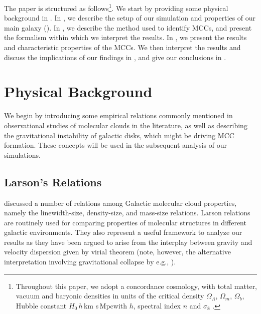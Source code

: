 \IfFileExists{emulateapjlegacy.cls}{\documentclass[iop]{emulateapjlegacy}}{\documentclass[iop]{emulateapj}}
\begin{document}
The paper is structured as follows\footnote{Throughout this paper, we adopt a concordance cosmology, with total matter, vacuum and baryonic densities in units of the critical density $\Omega_{\Lambda}$, $\Omega_m$, $\Omega_b$, Hubble constant $H_0$\,$h$\,km s\pmOne\,Mpc\pmOne with $h$, spectral index $n$ and $\sigma_8$ \citep{Planck14a}.}. We start by providing some physical background in . In , we describe the setup of our simulation and properties of our main galaxy (\flower). In , we describe the method used to identify MCCs, and present the formalism within which we interpret the results. In , we present the results and characteristic properties of the MCCs. We then interpret the results and discuss the implications of our findings in , and give our conclusions in .
%

\section{Physical Background}\label{sec:Back}
We begin by introducing some empirical relations commonly mentioned in observational studies of molecular clouds in the literature, as well as describing the gravitational instability of galactic disks, which might be driving MCC formation. These concepts will be used in the subsequent analysis of our simulations.

\subsection{Larson's Relations}\label{sec:PVE}

\citet{Larson81a} discussed a number of relations among Galactic molecular cloud properties, namely the linewidth-size, density-size, and mass-size relations. Larson relations are routinely used for comparing properties of molecular structures in different galactic environments. They also represent a useful framework to analyze our results as they have been argued to arise from the interplay between gravity and velocity dispersion given by virial theorem (note, however, the alternative interpretation involving gravitational collapse by e.g., \citealt{Ballesteros-Paredes11a}).
\end{document}
